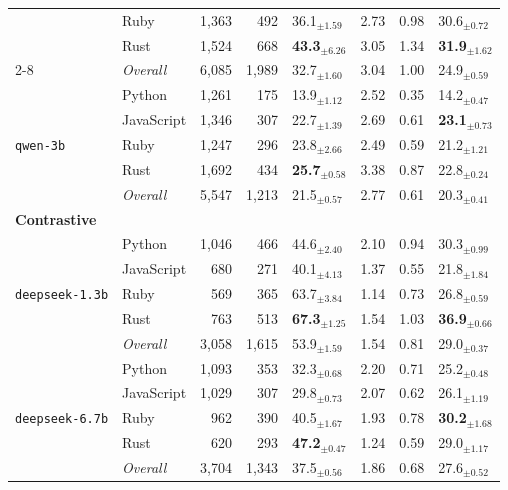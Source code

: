 \begin{longtable}{@{}llrrp{0.72cm}rrp{0.72cm}@{}}
       & Ruby & 1,363 & 492 & 36.1$_{\pm 1.59}$ & 2.73 & 0.98 & 30.6$_{\pm 0.72}$ \\
       & Rust & 1,524 & 668 & \textbf{43.3$_{\pm 6.26}$} & 3.05 & 1.34 & \textbf{31.9$_{\pm 1.62}$} \\ \cmidrule(lr){2-8}
      & \textit{Overall} & 6,085 & 1,989 & 32.7$_{\pm 1.60}$ & 3.04 & 1.00 & 24.9$_{\pm 0.59}$ \\
    \midrule
      \multirow{5}{*}{\texttt{qwen-3b}} & Python & 1,261 & 175 & 13.9$_{\pm 1.12}$ & 2.52 & 0.35 & 14.2$_{\pm 0.47}$ \\
       & JavaScript & 1,346 & 307 & 22.7$_{\pm 1.39}$ & 2.69 & 0.61 & \textbf{23.1$_{\pm 0.73}$} \\
       & Ruby & 1,247 & 296 & 23.8$_{\pm 2.66}$ & 2.49 & 0.59 & 21.2$_{\pm 1.21}$ \\
       & Rust & 1,692 & 434 & \textbf{25.7$_{\pm 0.58}$} & 3.38 & 0.87 & 22.8$_{\pm 0.24}$ \\ \cmidrule(lr){2-8}
      & \textit{Overall} & 5,547 & 1,213 & 21.5$_{\pm 0.57}$ & 2.77 & 0.61 & 20.3$_{\pm 0.41}$ \\
  \midrule[1.2pt]
  \multicolumn{8}{l}{\textbf{\small Contrastive}} \\
  \midrule
      \multirow{5}{*}{\texttt{deepseek-1.3b}} & Python & 1,046 & 466 & 44.6$_{\pm 2.40}$ & 2.10 & 0.94 & 30.3$_{\pm 0.99}$ \\
       & JavaScript & 680 & 271 & 40.1$_{\pm 4.13}$ & 1.37 & 0.55 & 21.8$_{\pm 1.84}$ \\
       & Ruby & 569 & 365 & 63.7$_{\pm 3.84}$ & 1.14 & 0.73 & 26.8$_{\pm 0.59}$ \\
       & Rust & 763 & 513 & \textbf{67.3$_{\pm 1.25}$} & 1.54 & 1.03 & \textbf{36.9$_{\pm 0.66}$} \\ \cmidrule(lr){2-8}
      & \textit{Overall} & 3,058 & 1,615 & 53.9$_{\pm 1.59}$ & 1.54 & 0.81 & 29.0$_{\pm 0.37}$ \\
    \midrule
      \multirow{5}{*}{\texttt{deepseek-6.7b}} & Python & 1,093 & 353 & 32.3$_{\pm 0.68}$ & 2.20 & 0.71 & 25.2$_{\pm 0.48}$ \\
       & JavaScript & 1,029 & 307 & 29.8$_{\pm 0.73}$ & 2.07 & 0.62 & 26.1$_{\pm 1.19}$ \\
       & Ruby & 962 & 390 & 40.5$_{\pm 1.67}$ & 1.93 & 0.78 & \textbf{30.2$_{\pm 1.68}$} \\
       & Rust & 620 & 293 & \textbf{47.2$_{\pm 0.47}$} & 1.24 & 0.59 & 29.0$_{\pm 1.17}$ \\ \cmidrule(lr){2-8}
      & \textit{Overall} & 3,704 & 1,343 & 37.5$_{\pm 0.56}$ & 1.86 & 0.68 & 27.6$_{\pm 0.52}$ \\

\end{longtable}
